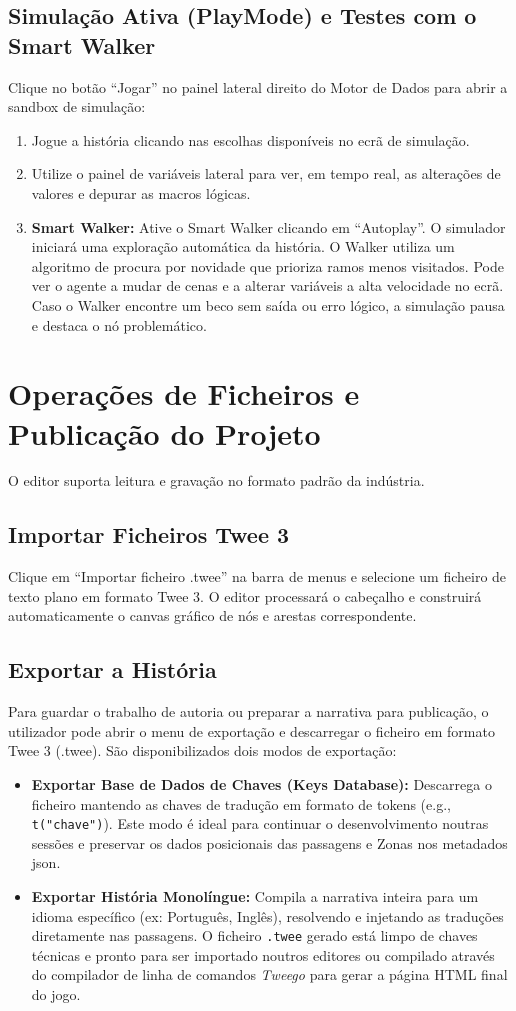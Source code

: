 \subsection{Simulação Ativa (PlayMode) e Testes com o Smart Walker}
Clique no botão ``Jogar'' no painel lateral direito do Motor de Dados para abrir a sandbox de simulação:
\begin{enumerate}
    \item Jogue a história clicando nas escolhas disponíveis no ecrã de simulação.
    \item Utilize o painel de variáveis lateral para ver, em tempo real, as alterações de valores e depurar as macros lógicas.
    \item \textbf{Smart Walker:} Ative o Smart Walker clicando em ``Autoplay''. O simulador iniciará uma exploração automática da história. O Walker utiliza um algoritmo de procura por novidade que prioriza ramos menos visitados. Pode ver o agente a mudar de cenas e a alterar variáveis a alta velocidade no ecrã. Caso o Walker encontre um beco sem saída ou erro lógico, a simulação pausa e destaca o nó problemático.
\end{enumerate}

\section{Operações de Ficheiros e Publicação do Projeto}
O editor suporta leitura e gravação no formato padrão da indústria.

\subsection{Importar Ficheiros Twee 3}
Clique em ``Importar ficheiro .twee'' na barra de menus e selecione um ficheiro de texto plano em formato Twee 3. O editor processará o cabeçalho e construirá automaticamente o canvas gráfico de nós e arestas correspondente.

\subsection{Exportar a História}
Para guardar o trabalho de autoria ou preparar a narrativa para publicação, o utilizador pode abrir o menu de exportação e descarregar o ficheiro em formato Twee 3 (.twee). São disponibilizados dois modos de exportação:
\begin{itemize}
    \item \textbf{Exportar Base de Dados de Chaves (Keys Database):} Descarrega o ficheiro mantendo as chaves de tradução em formato de tokens (e.g., \lstinline|t("chave")|). Este modo é ideal para continuar o desenvolvimento noutras sessões e preservar os dados posicionais das passagens e Zonas nos metadados \gls{json}.
    \item \textbf{Exportar História Monolíngue:} Compila a narrativa inteira para um idioma específico (ex: Português, Inglês), resolvendo e injetando as traduções diretamente nas passagens. O ficheiro \texttt{.twee} gerado está limpo de chaves técnicas e pronto para ser importado noutros editores ou compilado através do compilador de linha de comandos \textit{Tweego} para gerar a página HTML final do jogo.
\end{itemize}